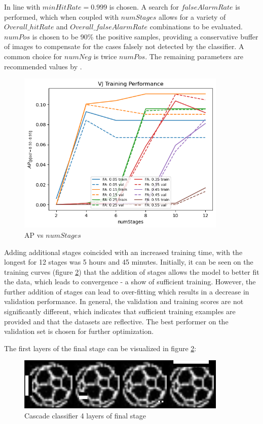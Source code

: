 \documentclass[a4paper,twoside,12pt]{report}
\begin{document}
In line with \cite{robovj} $minHitRate = 0.999$ is chosen. A search for $falseAlarmRate$ is performed, which when coupled with $numStages$ allows for a variety of $Overall\_hitRate$ and $Overall\_falseAlarmRate$ combinations to be evaluated. $numPos$ is chosen to be 90\% the positive samples, providing a conservative buffer of images to compensate for the cases falsely not detected by the classifier. A common choice for $numNeg$ is twice $numPos$. The remaining parameters are recommended values by \cite{vjdataset}. 

\begin{figure}[h!]
\begin{center}
\includegraphics[width=10cm]{images/vj_training.png}
\caption{AP vs $numStages$}
\label{fig:vjstages}
\end{center}
\end{figure}

Adding additional stages coincided with an increased training time, with the longest for 12 stages was 5 hours and 45 minutes. Initially, it can be seen on the training curves (figure \ref{fig:vjstages}) that the addition of stages allows the model to better fit the data, which leads to convergence - a show of sufficient training. However, the further addition of stages can lead to over-fitting which results in a decrease in validation performance. In general, the validation and training scores are not significantly different, which indicates that sufficient training examples are provided and that the datasets are reflective. The best performer on the validation set is chosen for further optimization.

The first layers of the final stage can be visualized in figure \ref{fig:vjstages}:

\begin{figure}[h!]
\begin{center}
\includegraphics[width=10cm]{images/vj_result.jpg}
\caption{Cascade classifier 4 layers of final stage}
\label{fig:vjstages}
\end{center}
\end{figure}
\end{document}
